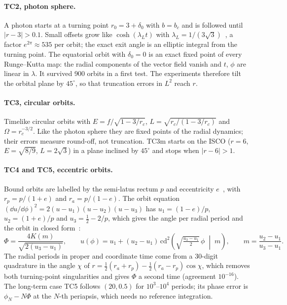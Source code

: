 \paragraph{TC2, photon sphere.} A photon starts at a turning point $r_0 = 3 + \delta_0$ with
$b = b_c$ and is followed until $|r - 3| > 0.1$. Small offsets grow like
$\cosh(\lambda_L t)$ with $\lambda_L = 1/(3\sqrt3)$~\cite{cardoso2009}, a factor $e^{2\pi}
\approx 535$ per orbit; the exact exit angle is an elliptic integral from the turning point.
The equatorial orbit with $\delta_0 = 0$ is an exact fixed point of every Runge--Kutta map:
the radial components of the vector field vanish and $t$, $\phi$ are linear in $\lambda$. It
survived 900 orbits in a first test. The experiments therefore tilt the orbital plane by
$45^\circ$, so that truncation errors in $L^2$ reach $r$.

\paragraph{TC3, circular orbits.} Timelike circular orbits with $E = f/\sqrt{1 - 3/r_c}$,
$L = \sqrt{r_c/(1 - 3/r_c)}$ and $\Omega = r_c^{-3/2}$. Like the photon sphere they are fixed
points of the radial dynamics; their errors measure round-off, not truncation. TC3m starts on
the ISCO ($r = 6$, $E = \sqrt{8/9}$, $L = 2\sqrt3$) in a plane inclined by $45^\circ$ and stops
when $|r - 6| > 1$.

\paragraph{TC4 and TC5, eccentric orbits.} Bound orbits are labelled by the semi-latus rectum
$p$ and eccentricity $e$~\cite{cutler1994}, with $r_p = p/(1 + e)$ and $r_a = p/(1 - e)$. The
orbit equation $(\dd u/\dd\phi)^2 = 2(u - u_1)(u - u_2)(u - u_3)$ has $u_1 = (1 - e)/p$,
$u_2 = (1 + e)/p$ and $u_3 = \tfrac12 - 2/p$, which gives the angle per radial period and the
orbit in closed form~\cite{chandrasekhar1983}:
\begin{equation}
  \Phi = \frac{4K(m)}{\sqrt{2(u_3 - u_1)}}, \qquad
  u(\phi) = u_1 + (u_2 - u_1)\,\mathrm{cd}^2\!\left(\sqrt{\tfrac{u_3 - u_1}{2}}\,\phi\;\middle|\;m\right),
  \qquad m = \frac{u_2 - u_1}{u_3 - u_1}.
  \label{eq:orbit}
\end{equation}
The radial periods in proper and coordinate time come from a 30-digit quadrature in the angle
$\chi$ of $r = \tfrac12(r_a + r_p) - \tfrac12(r_a - r_p)\cos\chi$, which removes both
turning-point singularities and gives $\Phi$ a second time (agreement $10^{-16}$). The
long-term case TC5 follows $(20, 0.5)$ for $10^3$--$10^4$ periods; its phase error is
$\phi_N - N\Phi$ at the $N$-th periapsis, which needs no reference integration.

